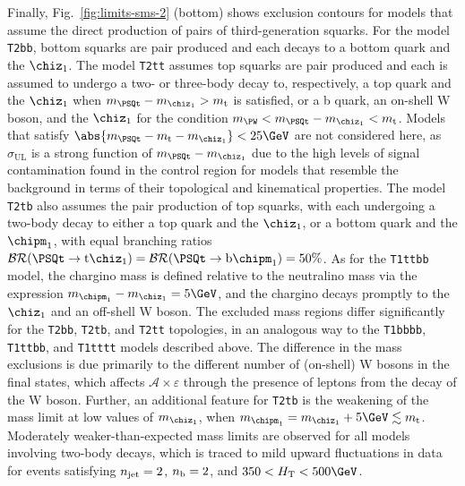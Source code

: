 Finally, Fig.~\ref{fig:limits-sms-2} (bottom) shows exclusion contours
for models that assume the direct production of pairs of
third-generation squarks. For the model \texttt{T2bb}, bottom squarks
are pair produced and each decays to a bottom quark and the
$\chiz_1$. The model \texttt{T2tt} assumes top squarks are pair
produced and each is assumed to undergo a two- or three-body decay to,
respectively, a top quark and the $\chiz_1$ when $m_{\PSQt} -
m_{\chiz_1} > m_\text{t}$ is satisfied, or a b quark, an on-shell W
boson, and the $\chiz_1$ for the condition $m_{\PW} < m_{\PSQt} -
m_{\chiz_1} < m_\text{t}$. Models that satisfy $\abs{m_{\PSQt} -
  m_\text{t} - m_{\chiz_1}} < 25\GeV$ are not considered here, as
$\sigma_\text{UL}$ is a strong function of $m_{\PSQt} - m_{\chiz_1}$
due to the high levels of signal contamination found in the \mj
control region for models that resemble the \ttbar background in terms
of their topological and kinematical properties. The model
\texttt{T2tb} also assumes the pair production of top squarks, with
each undergoing a two-body decay to either a top quark and the
$\chiz_1$, or a bottom quark and the $\chipm_1$, with equal branching
ratios $\mathcal{BR}(\PSQt \ra \text{t}\chiz_1) = \mathcal{BR}(\PSQt
\ra \text{b}\chipm_1) = 50\%$. As for the \texttt{T1ttbb} model, the
chargino mass is defined relative to the neutralino mass via the
expression $m_{\chipm_1} - m_{\chiz_1} = 5\GeV$, and the chargino
decays promptly to the $\chiz_1$ and an off-shell W boson. The
excluded mass regions differ significantly for the \texttt{T2bb},
\texttt{T2tb}, and \texttt{T2tt} topologies, in an analogous way to
the \texttt{T1bbbb}, \texttt{T1ttbb}, and \texttt{T1tttt} models
described above. The difference in the mass exclusions is due
primarily to the different number of (on-shell) W bosons in the final
states, which affects $\mathcal{A} \times \varepsilon$ through the
presence of leptons from the decay of the W boson. Further, an
additional feature for \texttt{T2tb} is the weakening of the mass
limit at low values of $m_{\chiz_1}$, when $m_{\chipm_1} = m_{\chiz_1}
+ 5\GeV \lesssim m_\text{t}$. Moderately weaker-than-expected mass
limits are observed for all models involving two-body decays, which is
traced to mild upward fluctuations in data for events satisfying
$\njet = 2$, $\nb = 2$, and $350 < \scalht < 500\GeV$.

